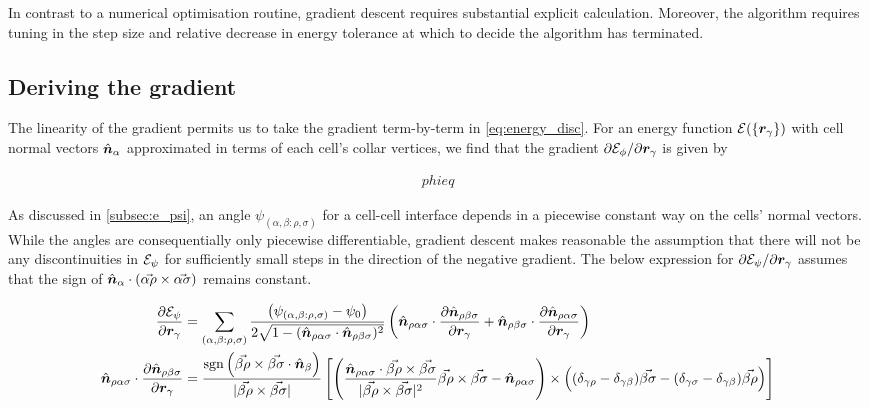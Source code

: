 In contrast to a numerical optimisation routine, gradient descent requires substantial explicit calculation. Moreover, the algorithm requires tuning in the step size and relative decrease in energy tolerance at which to decide the algorithm has terminated. 

\subsection{Deriving the gradient}

The linearity of the gradient permits us to take the gradient term-by-term in \cref{eq:energy_disc}. For an energy function $\mathcal{E}(\{ \bm{r}_\gamma\})$ with cell normal vectors $\hat{\bm{n}}_\alpha$ approximated in terms of each cell's collar vertices, we find that the gradient $\partial \mathcal{E}_\phi / \partial \bm{r}_\gamma$ is given by 

\begin{align}
	phi eq \label{eq:grad_phi}
\end{align}


As discussed in \ref{subsec:e_psi}, an angle $\psi_{(\alpha, \beta: \rho, \sigma)}$ for a cell-cell interface depends in a piecewise constant way on the cells' normal vectors. While the angles are consequentially only piecewise differentiable, gradient descent makes reasonable the assumption that there will not be any discontinuities in $\mathcal{E}_\psi$ for sufficiently small steps in the direction of the negative gradient. The below expression for $\partial \mathcal{E}_\psi / \partial \bm{r}_\gamma$ assumes that the sign of $\hat{\bm{n}}_\alpha \cdot (\vec{\alpha\rho}\times \vec{\alpha\sigma})$ remains constant.

\begin{align}
	\frac{\partial \mathcal{E}_\psi}{\partial \bm{r}_\gamma} &= \sum_{(\alpha,\beta: \rho,\sigma)} \frac{\left(\psi_{(\alpha,\beta:\rho,\sigma)} - \psi_0 \right)}{2\sqrt{1 - (\hat{\bm{n}}_{\rho\alpha\sigma}\cdot \hat{\bm{n}}_{\rho\beta\sigma})^2}} \left(\hat{\bm{n}}_{\rho\alpha\sigma} \cdot \frac{\partial \hat{\bm{n}}_{\rho\beta\sigma}}{\partial \bm{r}_\gamma} + \hat{\bm{n}}_{\rho\beta\sigma} \cdot \frac{\partial \hat{\bm{n}}_{\rho\alpha\sigma}}{\partial \bm{r}_\gamma} \right) \nonumber \\
	\hat{\bm{n}}_{\rho\alpha\sigma} \cdot \frac{\partial \hat{\bm{n}}_{\rho\beta\sigma}}{\partial \bm{r}_\gamma} &= \frac{\operatorname{sgn} \left(\vec{\beta\rho} \times \vec{\beta\sigma} \cdot \hat{\bm{n}}_\beta \right)}{|\vec{\beta\rho} \times \vec{\beta\sigma}|} \left[ \left(\frac{\hat{\bm{n}}_{\rho\alpha\sigma} \cdot \vec{\beta\rho}\times\vec{\beta\sigma}}{|\vec{\beta\rho}\times\vec{\beta\sigma}|^2} \vec{\beta\rho}\times\vec{\beta\sigma} - \hat{\bm{n}}_{\rho\alpha\sigma} \right) \times \left( (\delta_{\gamma\rho} - \delta_{\gamma\beta}) \vec{\beta\sigma} - (\delta_{\gamma\sigma} - \delta_{\gamma\beta}) \vec{\beta\rho} \right) \right] \label{eq:grad_psi}
\end{align}

